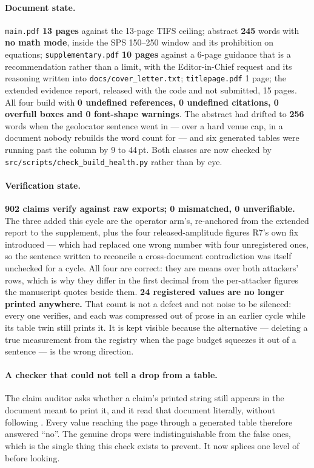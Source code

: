 \documentclass[11pt]{article}
\begin{document}
\paragraph{Document state.} \texttt{main.pdf} \textbf{13 pages} against the
13-page TIFS ceiling; abstract \textbf{245} words with \textbf{no math mode},
inside the SPS 150--250 window and its prohibition on equations;
\texttt{supplementary.pdf} \textbf{10 pages} against a 6-page guidance that is
a recommendation rather than a limit, with the Editor-in-Chief request and its
reasoning written into \texttt{docs/cover\_letter.txt};
\texttt{titlepage.pdf} 1 page; the extended evidence report, released with the
code and not submitted, 15 pages. All four build with \textbf{0 undefined
references, 0 undefined citations, 0 overfull boxes and 0 font-shape
warnings}. The abstract had drifted to \textbf{256} words when the geolocator
sentence went in --- over a hard venue cap, in a document nobody rebuilds the
word count for --- and six generated tables were running past the column by 9
to 44\,pt. Both classes are now checked by
\texttt{src/scripts/check\_build\_health.py} rather than by eye.

\paragraph{Verification state.} \textbf{902 claims verify against raw exports;
0 mismatched, 0 unverifiable.} The three added this cycle are the operator
arm's, re-anchored from the extended report to the supplement, plus the four
released-amplitude figures R7's own fix introduced --- which had replaced one
wrong number with four unregistered ones, so the sentence written to reconcile
a cross-document contradiction was itself unchecked for a cycle. All four are
correct: they are means over both attackers' rows, which is why they differ in
the first decimal from the per-attacker figures the manuscript quotes beside
them. \textbf{24 registered values are no longer printed anywhere.} That count
is not a defect and not noise to be silenced: every one verifies, and each was
compressed out of prose in an earlier cycle while its table twin still prints
it. It is kept visible because the alternative --- deleting a true measurement
from the registry when the page budget squeezes it out of a sentence --- is
the wrong direction.

\paragraph{A checker that could not tell a drop from a table.} The claim
auditor asks whether a claim's printed string still appears in the document
meant to print it, and it read that document literally, without following
\verb||. Every value reaching the page through a generated table
therefore answered ``no''. The genuine drops were indistinguishable from the
false ones, which is the single thing this check exists to prevent. It now
splices one level of \verb|| before looking.
\end{document}
